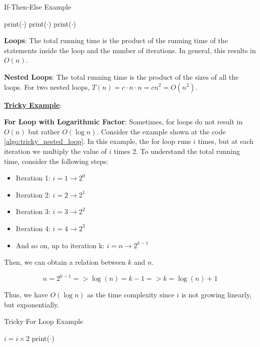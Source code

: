 \documentclass[a4paper,10pt]{article}
\newcommand{\hlt}[1]{\colorbox{color3}{#1}}
\begin{document}
\begin{algorithm}
    \caption{If-Then-Else Example}
    \begin{algorithmic}[1]
        \State print($\cdot$) 
            \State print($\cdot$) 
        \Else
                \State print($\cdot$) 
            \EndFor
        \EndIf
    \end{algorithmic}
    \label{algo:if_and_else}
\end{algorithm}

\textbf{Loops}: The total running time is the product of the running time of the statements inside the loop and the number of iterations. In general, this results in $O(n)$.

\textbf{Nested Loops}: The total running time is the product of the sizes of all the loops. For two nested loops, $T(n) = c \cdot n \cdot n = cn^2 = O(n^2)$.

\underline{\textbf{Tricky Example}}:

\textbf{For Loop with Logarithmic Factor}: Sometimes, for loops do not result in $O(n)$ but rather $O(\log n)$. Consider the example shown at the code \ref{algo:tricky_nested_loop}. In this example, the for loop runs $i$ times, but at each iteration we multiply the value of $i$ times 2. To understand the total running time, consider the following steps:

\begin{itemize}
    \item Iteration 1: $i = 1 \rightarrow 2^0$
    \item Iteration 2: $i = 2 \rightarrow 2^1$
    \item Iteration 3: $i = 3 \rightarrow 2^2$
    \item Iteration 4: $i = 4 \rightarrow 2^3$
    \item And so on, up to iteration k: $i = n \rightarrow 2^{k-1}$
\end{itemize}

Then, we can obtain a relation between $k$ and $n$.

$$n = 2^{k-1} => \log(n) = k - 1 => k = \log(n) + 1$$

Thus, we have \hlt{$O(\log n)$} as the time complexity since $i$ is not growing linearly, but exponentially.

\begin{algorithm}
    \caption{Tricky For Loop Example}
    \begin{algorithmic}[1]
            \State $i = i \times 2$
            \State print($\cdot$) \Comment{\hlt{$O(\log i)$}}
        \EndFor
    \end{algorithmic}
    \label{algo:tricky_nested_loop}
\end{algorithm}
\end{document}
